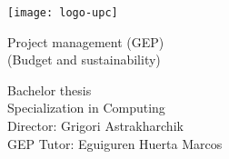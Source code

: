 
\thispagestyle{empty}
\clearpage
\setcounter{page}{-1}

\makeatletter
\begin{titlepage}
{
    \centering
    \texttt{[image: logo-upc]}
    \null
    \vspace{3em}
    {\Huge \bfseries \@title \par}
    \vspace{2em}
    {\large Project management (GEP) \\
        (Budget and sustainability) %
    \par}
    \vspace{3em}
    {\large \scshape \@date \par}

    \vfill
    {\raggedleft \large \bfseries \@author \par}
    \vspace{1em}
    {\raggedleft \large
        Bachelor thesis \\
        Specialization in Computing \\
        \vspace{2em}
        Director: Grigori Astrakharchik \\
        GEP Tutor: Eguiguren Huerta Marcos
    \par}
}
\end{titlepage}
\makeatother
